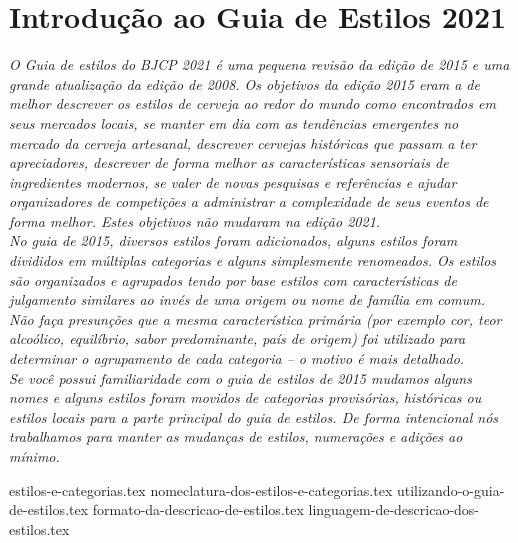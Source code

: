 \clearpage
{}
\divisorLine
\section*{Introdução ao Guia de Estilos 2021}
\textit{O Guia de estilos do BJCP 2021 é uma pequena revisão da edição de 2015 e uma grande atualização da edição de 2008. Os objetivos da edição 2015 eram a de melhor descrever os estilos de cerveja ao redor do mundo como encontrados em seus mercados locais, se manter em dia com as tendências emergentes no mercado da cerveja artesanal, descrever cervejas históricas que passam a ter apreciadores, descrever de forma melhor as características sensoriais de ingredientes modernos, se valer de novas pesquisas e referências e ajudar organizadores de competições a administrar a complexidade de seus eventos de forma melhor. Estes objetivos não mudaram na edição 2021.}\\
\textit{No guia de 2015, diversos estilos foram adicionados, alguns estilos foram divididos em múltiplas categorias e alguns simplesmente renomeados. Os estilos são organizados e agrupados tendo por base estilos com características de julgamento similares ao invés de uma origem ou nome de família em comum. Não faça presunções que a mesma característica primária (por exemplo cor, teor alcoólico, equilíbrio, sabor predominante, país de origem) foi utilizado para determinar o agrupamento de cada categoria – o motivo é mais detalhado.}\\
\textit{Se você possui familiaridade com o guia de estilos de 2015 mudamos alguns nomes e alguns estilos foram movidos de categorias provisórias, históricas ou estilos locais para a parte principal do guia de estilos. De forma intencional nós trabalhamos para manter as mudanças de estilos, numerações e adições ao mínimo.}\\
\begin{multicols}{2}
{estilos-e-categorias.tex}
{nomeclatura-dos-estilos-e-categorias.tex}
{utilizando-o-guia-de-estilos.tex}
{formato-da-descricao-de-estilos.tex}
{linguagem-de-descricao-dos-estilos.tex}
\end{multicols}